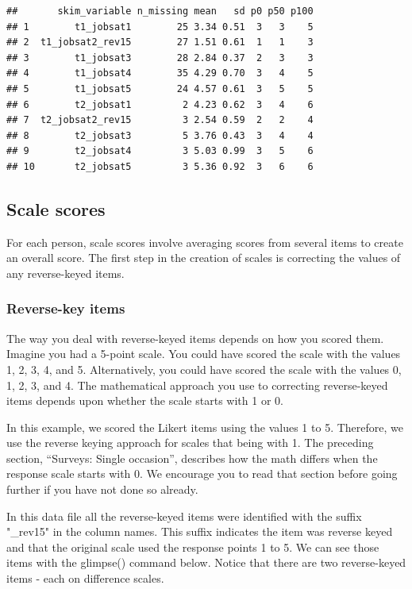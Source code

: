 \documentclass[
]{krantz}
\begin{document}
\begin{verbatim}
##       skim_variable n_missing mean   sd p0 p50 p100
## 1        t1_jobsat1        25 3.34 0.51  3   3    5
## 2  t1_jobsat2_rev15        27 1.51 0.61  1   1    3
## 3        t1_jobsat3        28 2.84 0.37  2   3    3
## 4        t1_jobsat4        35 4.29 0.70  3   4    5
## 5        t1_jobsat5        24 4.57 0.61  3   5    5
## 6        t2_jobsat1         2 4.23 0.62  3   4    6
## 7  t2_jobsat2_rev15         3 2.54 0.59  2   2    4
## 8        t2_jobsat3         5 3.76 0.43  3   4    4
## 9        t2_jobsat4         3 5.03 0.99  3   5    6
## 10       t2_jobsat5         3 5.36 0.92  3   6    6
\end{verbatim}

\hypertarget{scale-scores-1}{%
\subsection{Scale scores}\label{scale-scores-1}}

For each person, scale scores involve averaging scores from several items to create an overall score. The first step in the creation of scales is correcting the values of any reverse-keyed items.

\hypertarget{reverse-key-items-1}{%
\subsubsection{Reverse-key items}\label{reverse-key-items-1}}

The way you deal with reverse-keyed items depends on how you scored them. Imagine you had a 5-point scale. You could have scored the scale with the values 1, 2, 3, 4, and 5. Alternatively, you could have scored the scale with the values 0, 1, 2, 3, and 4. The mathematical approach you use to correcting reverse-keyed items depends upon whether the scale starts with 1 or 0.

In this example, we scored the Likert items using the values 1 to 5. Therefore, we use the reverse keying approach for scales that being with 1. The preceding section, ``Surveys: Single occasion'', describes how the math differs when the response scale starts with 0. We encourage you to read that section before going further if you have not done so already.

In this data file all the reverse-keyed items were identified with the suffix "\_rev15" in the column names. This suffix indicates the item was reverse keyed and that the original scale used the response points 1 to 5. We can see those items with the glimpse() command below. Notice that there are two reverse-keyed items - each on difference scales.
\end{document}
